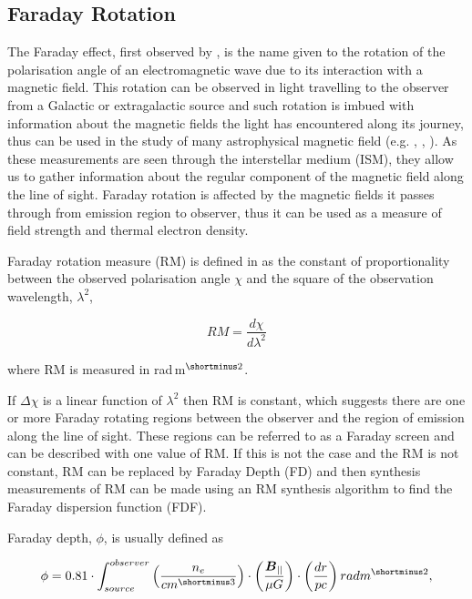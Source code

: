 \subsection{Faraday Rotation}
\label{sec: Faraday rotation}

 The Faraday effect, first observed by \cite{original_Faraday_rotation}, is the name given to the rotation of the polarisation angle of an electromagnetic wave due to its interaction with a magnetic field. This rotation can be observed in light travelling to the observer from a Galactic or extragalactic source and such rotation is imbued with information about the magnetic fields the light has encountered along its journey, thus can be used in the study of many astrophysical magnetic field (e.g. \cite{FR_cluster}, \cite{FR_sagA}, \cite{FR_planet_nebula}). As these measurements are seen through the interstellar medium (ISM), they allow us to gather information about the regular component of the magnetic field along the line of sight. Faraday rotation is affected by the magnetic fields it passes through from emission region to observer, thus it can be used as a measure of field strength and thermal electron density.

Faraday rotation measure (RM) is defined in \cite{burn_1966} as the constant of proportionality between the observed polarisation angle $\chi$ and the square of the observation wavelength, $\lambda^2$,

\begin{equation}
    RM = \frac{d\chi}{d\lambda^2}
    \label{Eq: rotation measure}
\end{equation}

where RM is measured in rad$\,$m$^{\shortminus2}$.

If $\Delta \chi$ is a linear function of $\lambda^2$ then RM is constant, which suggests there are one or more Faraday rotating regions between the observer and the region of emission along the line of sight. These regions can be referred to as a Faraday screen and can be described with one value of RM. If this is not the case and the RM is not constant, RM can be replaced by Faraday Depth (FD) and then synthesis measurements of RM can be made using an RM synthesis algorithm to find the Faraday dispersion function (FDF). 

Faraday depth, $\phi$, is usually defined as 

\begin{equation}
    \phi = 0.81 \cdot \int_{source}^{observer} \left( \frac{n_e}{cm^{\shortminus3}}\right) \cdot \left(\frac{\boldsymbol{B}_{||}}{\mu G}\right) \cdot \left(\frac{dr}{pc}\right) rad \space m^{\shortminus2},
    \label{Eq: Faraday depth}
\end{equation}

